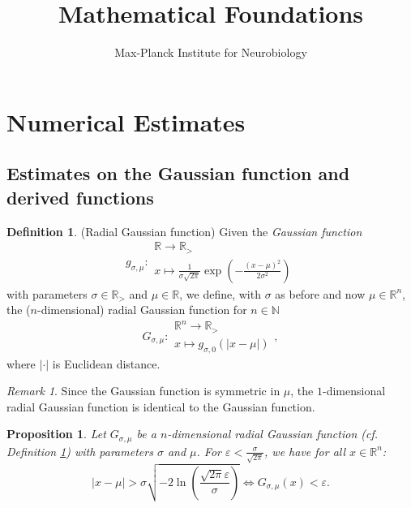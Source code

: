 \documentclass{article}
\title{Mathematical Foundations}
\author{Max-Planck Institute for Neurobiology}
\theoremstyle{plain}
\newtheorem{prp}[lma]{Proposition}
\theoremstyle{remark}
\newtheorem*{rmk}{Remark}
\theoremstyle{definition}
\newtheorem{dfn}[lma]{Definition}
\begin{document}
 \maketitle
 \section{Numerical Estimates}
 \subsection{Estimates on the Gaussian function and derived functions}
 \begin{dfn}{(Radial Gaussian function)} \label{radialgaussian}
Given the \emph{Gaussian function}
 \begin{equation*}
g_{\sigma, \mu}: \begin{array}{c} \mathbb{R} \to \mathbb{R}_> \\  x \mapsto \frac{1}{\sigma \sqrt{2 \pi}} \exp \left( - \frac{(x - \mu)^2}{2 \sigma^2} \right) \end{array}
 \end{equation*}
 with parameters $\sigma \in \mathbb{R}_>$ and $\mu \in \mathbb{R}$, we define, with $\sigma$ as before and now $\mu \in \mathbb{R}^n$, the ($n$-dimensional) radial Gaussian function for $n \in \mathbb{N}$
 \begin{equation*}
 G_{\sigma, \mu}: \begin{array}{c} \mathbb{R}^n \to \mathbb{R}_> \\ x \mapsto g_{\sigma, 0} ( | x - \mu | ) \end{array},
 \end{equation*}
 where $| \cdot |$ is Euclidean distance.
 \end{dfn}
 \begin{rmk}
 Since the Gaussian function is symmetric in $\mu$, the $1$-dimensional radial Gaussian function is identical to the Gaussian function.
 \end{rmk}
 \begin{prp} Let $G_{\sigma, \mu}$ be a $n$-dimensional radial Gaussian function (cf. Definition \ref{radialgaussian}) with parameters $\sigma$ and $\mu$. For $\varepsilon < \frac{\sigma}{\sqrt{2 \pi}}$, we have for all $x \in \mathbb{R}^n$:
 \begin{equation*}
|x - \mu| > \sigma \sqrt{ - 2 \ln \left( \frac{\sqrt{2 \pi} \varepsilon}{\sigma} \right)} \iff G_{\sigma, \mu}(x) < \varepsilon.
 \end{equation*}
 \end{prp}
\end{document}
